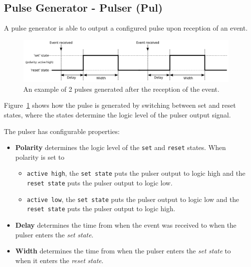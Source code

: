 \documentclass[12pt,a4paper]{article}
\begin{document}
\subsection{Pulse Generator - Pulser (Pul)}\label{sec:Pulser}
A pulse generator is able to output a configured pulse upon reception of an event.
\begin{figure}[H]
	\centering
	\includegraphics[width=\columnwidth]{./img/pulserGeneric}
	\caption{An example of 2 pulses generated after the reception of the event.}
	\label{fig:pulser_generic}
\end{figure}
Figure~\ref{fig:pulser_generic} shows how the pulse is generated by switching between set and reset states, where the states determine the logic level of the pulser output signal.

The pulser has configurable properties:
\begin{itemize}
	\item \textbf{Polarity} determines the logic level of the \texttt{set} and \texttt{reset} states. When polarity is set to
	\begin{itemize}
		\item \texttt{active high}, the \texttt{set state} puts the pulser output to logic high and the \texttt{reset state} puts the pulser output to logic low. 
		\item \texttt{active low}, the \texttt{set state} puts the pulser output to logic low and the \texttt{reset state} puts the pulser output to logic high.
	\end{itemize}
	\item  \textbf{Delay} determines the time from when the event was received to when the pulser enters the \textit{set state}.
	\item  \textbf{Width} determines the time from when the pulser enters the \textit{set state} to when it enters the \textit{reset state}.
\end{itemize}
\end{document}
